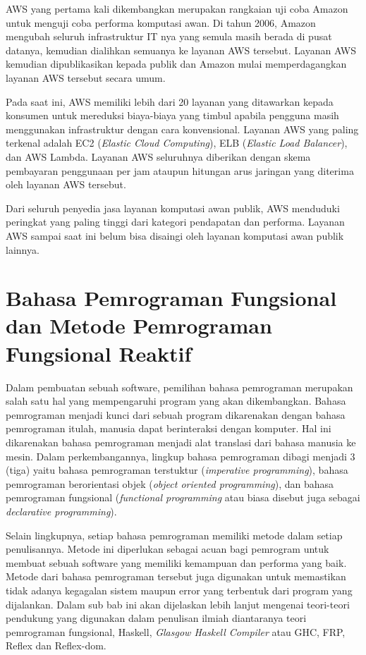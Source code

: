 \documentclass[pi.tex]{subfile}
\begin{document}
AWS yang pertama kali dikembangkan merupakan rangkaian uji coba Amazon untuk menguji coba performa komputasi awan. Di tahun 2006, Amazon mengubah seluruh infrastruktur IT nya yang semula masih berada di pusat datanya, kemudian dialihkan semuanya ke layanan AWS tersebut. Layanan AWS kemudian dipublikasikan kepada publik dan Amazon mulai memperdagangkan layanan AWS tersebut secara umum.

Pada saat ini, AWS memiliki lebih dari 20 layanan yang ditawarkan kepada konsumen untuk mereduksi biaya-biaya yang timbul apabila pengguna masih menggunakan infrastruktur dengan cara konvensional. Layanan AWS yang paling terkenal adalah EC2 (\emph{Elastic Cloud Computing}), ELB (\emph{Elastic Load Balancer}), dan AWS Lambda. Layanan AWS seluruhnya diberikan dengan skema pembayaran penggunaan per jam ataupun hitungan arus jaringan yang diterima oleh layanan AWS tersebut.

Dari seluruh penyedia jasa layanan komputasi awan publik, AWS menduduki peringkat yang paling tinggi dari kategori pendapatan dan performa. Layanan AWS sampai saat ini belum bisa disaingi oleh layanan komputasi awan publik lainnya.

\section{Bahasa Pemrograman Fungsional dan Metode Pemrograman Fungsional Reaktif}
Dalam pembuatan sebuah software, pemilihan bahasa pemrograman merupakan salah satu hal yang mempengaruhi program yang akan dikembangkan. Bahasa pemrograman menjadi kunci dari sebuah program dikarenakan dengan bahasa pemrograman itulah, manusia dapat berinteraksi dengan komputer. Hal ini dikarenakan bahasa pemrograman menjadi alat translasi dari bahasa manusia ke mesin. Dalam perkembangannya, lingkup bahasa pemrograman dibagi menjadi 3 (tiga) yaitu bahasa pemrograman terstuktur (\emph{imperative programming}), bahasa pemrograman berorientasi objek (\emph{object oriented programming}), dan bahasa pemrograman fungsional (\emph{functional programming} atau biasa disebut juga sebagai \emph{declarative programming}).

Selain lingkupnya, setiap bahasa pemrograman memiliki metode dalam setiap penulisannya. Metode ini diperlukan sebagai acuan bagi pemrogram untuk membuat sebuah software yang memiliki kemampuan dan performa yang baik. Metode dari bahasa pemrograman tersebut juga digunakan untuk memastikan tidak adanya kegagalan sistem maupun error yang terbentuk dari program yang dijalankan. Dalam sub bab ini akan dijelaskan lebih lanjut mengenai teori-teori pendukung yang digunakan dalam penulisan ilmiah diantaranya teori pemrograman fungsional, Haskell, \emph{Glasgow Haskell Compiler} atau GHC, FRP, Reflex dan Reflex-dom.
\end{document}
